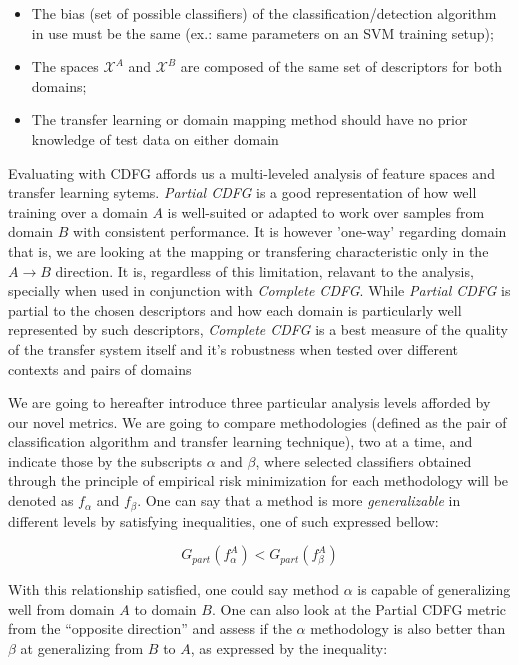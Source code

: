 \begin{itemize}
    \item The bias (set of possible classifiers) of the classification/detection algorithm in use must be the same (ex.: same parameters on an SVM training setup);
    \item The spaces $\mathcal{X}^A$ and $\mathcal{X}^B$ are composed of the same set of descriptors for both domains;
    \item The transfer learning or domain mapping method should have no prior knowledge of test data on either domain
\end{itemize}



Evaluating with CDFG affords us a multi-leveled analysis of feature spaces and transfer learning sytems. \textit{Partial CDFG} is a good representation of how well training over a domain $A$ is well-suited or adapted to work over samples from domain $B$ with consistent performance. It is however 'one-way' regarding domain that is, we are looking at the mapping or transfering characteristic only in the $A \longrightarrow B$ direction. It is, regardless of this limitation, relavant to the analysis, specially when used in conjunction with \textit{Complete CDFG}. While \textit{Partial CDFG} is partial to the chosen descriptors and how each domain is particularly well represented by such descriptors, \textit{Complete CDFG} is a best measure of the quality of the transfer system itself and it's robustness when tested over different contexts and pairs of domains



We are going to hereafter introduce three particular analysis levels afforded by our novel metrics. We are going to compare methodologies (defined as the pair of classification algorithm and transfer learning technique), two at a time, and indicate those by the subscripts $\alpha$ and $\beta$, where selected classifiers obtained through the principle of empirical risk minimization for each methodology will be denoted as $f_\alpha$ and $f_\beta$. One can say that a method is more \textit{generalizable} in different levels by satisfying inequalities, one of such expressed bellow:

\begin{equation}    
\label{eq:OneDirectionA}
G_{part}(f_\alpha^A) < G_{part}(f_\beta^A)
\end{equation}

With this relationship satisfied, one could say method $\alpha$ is capable of generalizing well from domain $A$ to domain $B$. One can also look at the Partial CDFG metric from the ``opposite direction'' and assess if the $\alpha$ methodology is also better than $\beta$ at generalizing from $B$ to $A$, as expressed by the inequality:


